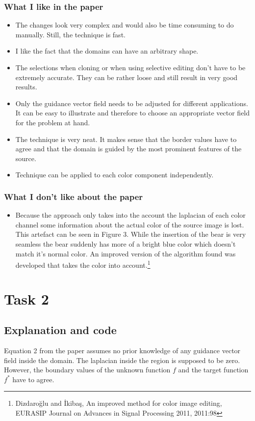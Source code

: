 \documentclass[]{book}
\theoremstyle{definition}
\begin{document}
\subsubsection*{What I like in the paper}
\begin{itemize}
\item The changes look very complex and would also be time consuming to do manually. Still, the technique is fast.
\item I like the fact that the domains can have an arbitrary shape. 
\item The selections when cloning or when using selective editing don't have to be extremely accurate. They can be rather loose and still result in very good results.
\item Only the guidance vector field needs to be adjusted for different applications. It can be easy to illustrate and therefore to choose an appropriate vector field for the problem at hand.
\item The technique is very neat. It makes sense that the border values have to agree and that the domain is guided by the most prominent features of the source.
\item Technique can be applied to each color component independently.
\end{itemize}

\subsubsection*{What I don't like about the paper}
\begin{itemize}
\item Because the approach only takes into the account the laplacian of each color channel some information about the actual color of the source image is lost. This artefact can be seen in Figure 3. While the insertion of the bear is very seamless the bear suddenly has more of a bright blue color which doesn't match it's normal color. An improved version of the algorithm found was developed that takes the color into account.\footnote{Dizdaroğlu and İkibaş, An improved method for color image editing, EURASIP Journal on Advances in Signal Processing 2011, 2011:98}
\end{itemize}


\section*{Task 2}
\subsection*{Explanation and code}
Equation 2 from the paper assumes no prior knowledge of any guidance vector field inside the domain. The laplacian inside the region is supposed to be zero. However, the boundary values of the unknown function $f$ and the target function $f^*$ have to agree.
\end{document}
